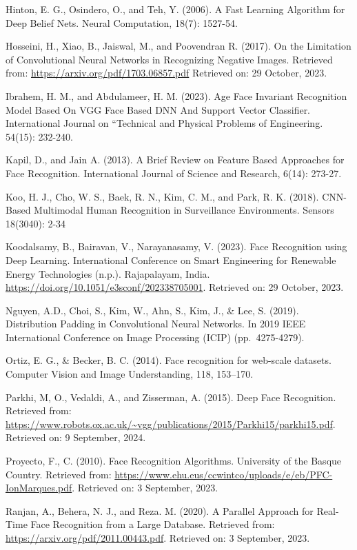 \documentclass[
  12pt,
]{report}
\begin{document}
Hinton, E. G., Osindero, O., and Teh, Y. (2006). A Fast Learning
Algorithm for \hangindent=40pt Deep Belief Nets. Neural Computation,
18(7): 1527-54.

Hosseini, H., Xiao, B., Jaiswal, M., and Poovendran R. (2017). On the
Limitation \hangindent=40pt of Convolutional Neural Networks in
Recognizing Negative Images. Retrieved from:
\url{https://arxiv.org/pdf/1703.06857.pdf} Retrieved on: 29 October,
2023.

Ibrahem, H. M., and Abdulameer, H. M. (2023). Age Face Invariant
Recognition \hangindent=40pt Model Based On VGG Face Based DNN And
Support Vector Classifier. International Journal on ``Technical and
Physical Problems of Engineering. 54(15): 232-240.

Kapil, D., and Jain A. (2013). A Brief Review on Feature Based
Approaches for \hangindent=40pt Face Recognition. International Journal
of Science and Research, 6(14): 273-27.

Koo, H. J., Cho, W. S., Baek, R. N., Kim, C. M., and Park, R. K. (2018).
\hangindent=40pt CNN-Based Multimodal Human Recognition in Surveillance
Environments. Sensors 18(3040): 2-34

Koodalsamy, B., Bairavan, V., Narayanasamy, V. (2023). Face Recognition
using Deep \hangindent=40pt Learning. International Conference on Smart
Engineering for Renewable Energy Technologies (n.p.). Rajapalayam,
India. \url{https://doi.org/10.1051/e3sconf/202338705001}. Retrieved on:
29 October, 2023.

Nguyen, A.D., Choi, S., Kim, W., Ahn, S., Kim, J., \& Lee, S. (2019).
Distribution \hangindent=40pt Padding in Convolutional Neural Networks.
In 2019 IEEE International Conference on Image Processing (ICIP)
(pp.~4275-4279).

Ortiz, E. G., \& Becker, B. C. (2014). Face recognition for web-scale
datasets. \hangindent=40pt Computer Vision and Image Understanding, 118,
153--170.

Parkhi, M, O., Vedaldi, A., and Zisserman, A. (2015). Deep Face
Recognition. Retrieved \hangindent=40pt from:
\url{https://www.robots.ox.ac.uk/~vgg/publications/2015/Parkhi15/parkhi15.pdf}.
Retrieved on: 9 September, 2024.

Proyecto, F., C. (2010). Face Recognition Algorithms. University of the
Basque \hangindent=40pt Country. Retrieved from:
\url{https://www.ehu.eus/ccwintco/uploads/e/eb/PFC-IonMarques.pdf}.
Retrieved on: 3 September, 2023.

Ranjan, A., Behera, N. J., and Reza. M. (2020). A Parallel Approach for
Real-Time Face \hangindent=40pt Recognition from a Large Database.
Retrieved from: \url{https://arxiv.org/pdf/2011.00443.pdf}. Retrieved
on: 3 September, 2023.
\end{document}
